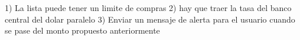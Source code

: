 1) La lista puede tener un limite de compras
2) hay que traer la tasa del banco central del dolar paralelo 
3) Enviar un mensaje de alerta para el usuario cuando se pase del monto propuesto anteriormente

